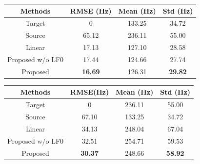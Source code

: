 \begin{table}
    \begin{subtable}[t]{0.9\textwidth}
        \centering
        \begin{tabular}[t]{ cccc }
            \toprule
            Methods  & RMSE (Hz) & Mean (Hz) & Std (Hz) \\
            \midrule
            Target                  & 0 & 133.25 & 34.72             \\
            \midrule
            Source                    & 65.12 & 236.11 & 55.00            \\
            Linear                       & 17.13 & 127.10 & 28.58               \\
            Proposed w/o LF0                       & 17.44 & 124.66 & 27.74            \\
            Proposed                       & \textbf{16.69} & 126.31 & \textbf{29.82}   \\
            \bottomrule
            \end{tabular} 
        \label{tab:f0f2m}
    \end{subtable}
    \bigskip
    \vspace{1mm}
    \quad
    \begin{subtable}[t]{0.9\textwidth}
        \centering
        \begin{tabular}[t]{ cccc }
            \toprule
             Methods & RMSE(Hz) & Mean (Hz) & Std (Hz) \\
            \midrule
            Target                   & 0 & 236.11 & 55.00            \\
            \midrule
            Source                        & 67.10 & 133.25 & 34.72            \\
            Linear                     & 34.13 & 248.04 & 67.04              \\
            Proposed w/o LF0                   & 32.51 & 254.71 & 59.53              \\
            Proposed                      & \textbf{30.37} & 248.66 & \textbf{58.92}   \\
            \bottomrule
          \end{tabular}
        \label{tab:f0m2f}
    \end{subtable}

\label{tab:mse}
\end{table}  

